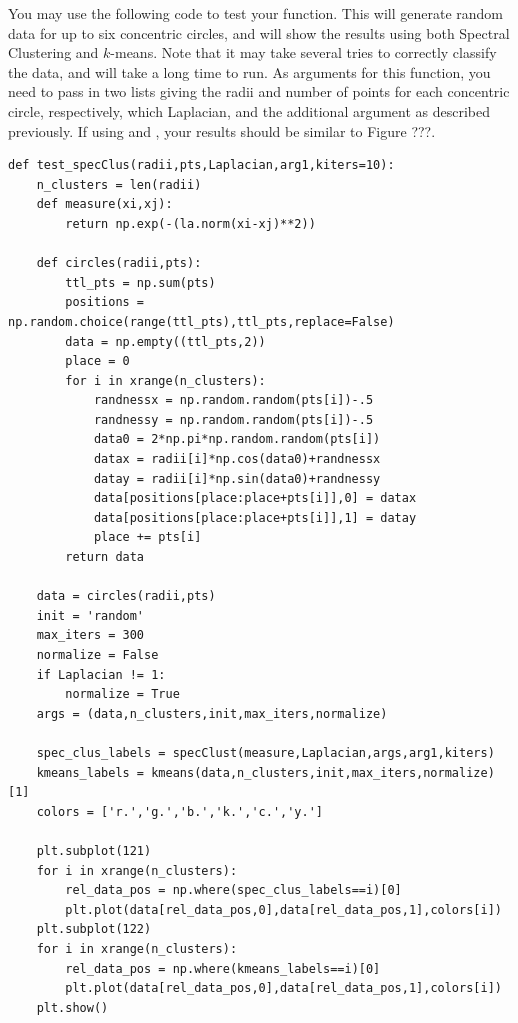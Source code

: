 You may use the following code to test your function.  This will generate random data for up to six concentric circles, and will show the results using both Spectral Clustering and $k$-means.  Note that it may take several tries to correctly classify the data, and will take a long time to run.  As arguments for this function, you need to pass in two lists giving the radii and number of points for each concentric circle, respectively, which Laplacian, and the additional argument  as described previously. If using  and ,  your results should be similar to Figure ???.
\begin{lstlisting}
def test_specClus(radii,pts,Laplacian,arg1,kiters=10):
    n_clusters = len(radii)
    def measure(xi,xj):
        return np.exp(-(la.norm(xi-xj)**2))
    
    def circles(radii,pts):
        ttl_pts = np.sum(pts)
        positions = np.random.choice(range(ttl_pts),ttl_pts,replace=False)
        data = np.empty((ttl_pts,2))
        place = 0
        for i in xrange(n_clusters):
            randnessx = np.random.random(pts[i])-.5
            randnessy = np.random.random(pts[i])-.5
            data0 = 2*np.pi*np.random.random(pts[i])
            datax = radii[i]*np.cos(data0)+randnessx
            datay = radii[i]*np.sin(data0)+randnessy
            data[positions[place:place+pts[i]],0] = datax
            data[positions[place:place+pts[i]],1] = datay
            place += pts[i]
        return data
    
    data = circles(radii,pts)    
    init = 'random'
    max_iters = 300
    normalize = False
    if Laplacian != 1:
        normalize = True
    args = (data,n_clusters,init,max_iters,normalize)
    
    spec_clus_labels = specClust(measure,Laplacian,args,arg1,kiters)
    kmeans_labels = kmeans(data,n_clusters,init,max_iters,normalize)[1]
    colors = ['r.','g.','b.','k.','c.','y.']
    
    plt.subplot(121)
    for i in xrange(n_clusters):
        rel_data_pos = np.where(spec_clus_labels==i)[0]
        plt.plot(data[rel_data_pos,0],data[rel_data_pos,1],colors[i])
    plt.subplot(122)
    for i in xrange(n_clusters):
        rel_data_pos = np.where(kmeans_labels==i)[0]
        plt.plot(data[rel_data_pos,0],data[rel_data_pos,1],colors[i])
    plt.show()
\end{lstlisting}

